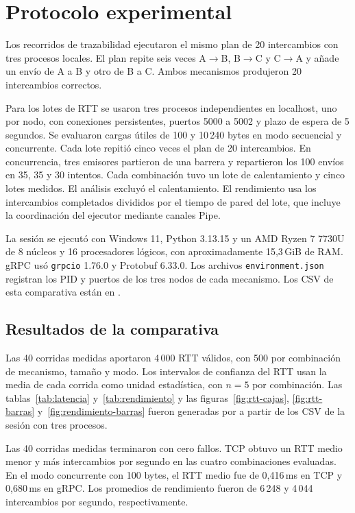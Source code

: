 \section{Protocolo experimental}
Los recorridos de trazabilidad ejecutaron el mismo plan de 20 intercambios con tres procesos locales. El plan repite seis veces A$\to$B, B$\to$C y C$\to$A y añade un envío de A a B y otro de B a C. Ambos mecanismos produjeron 20 intercambios correctos.

Para los lotes de RTT se usaron tres procesos independientes en localhost, uno por nodo, con conexiones persistentes, puertos 5000 a 5002 y plazo de espera de 5 segundos. Se evaluaron cargas útiles de 100 y 10\,240 bytes en modo secuencial y concurrente. Cada lote repitió cinco veces el plan de 20 intercambios. En concurrencia, tres emisores partieron de una barrera y repartieron los 100 envíos en 35, 35 y 30 intentos. Cada combinación tuvo un lote de calentamiento y cinco lotes medidos. El análisis excluyó el calentamiento. El rendimiento usa los intercambios completados divididos por el tiempo de pared del lote, que incluye la coordinación del ejecutor mediante canales Pipe.

La sesión se ejecutó con Windows 11, Python 3.13.15 y un AMD Ryzen 7 7730U de 8 núcleos y 16 procesadores lógicos, con aproximadamente 15,3\,GiB de RAM. gRPC usó \texttt{grpcio} 1.76.0 y Protobuf 6.33.0. Los archivos \texttt{environment.json} registran los PID y puertos de los tres nodos de cada mecanismo. Los CSV de esta comparativa están en .

\subsection{Resultados de la comparativa}
Las 40 corridas medidas aportaron 4\,000 RTT válidos, con 500 por combinación de mecanismo, tamaño y modo. Los intervalos de confianza del RTT usan la media de cada corrida como unidad estadística, con \(n=5\) por combinación. Las tablas~\ref{tab:latencia} y~\ref{tab:rendimiento} y las figuras~\ref{fig:rtt-cajas}, \ref{fig:rtt-barras} y~\ref{fig:rendimiento-barras} fueron generadas por  a partir de los CSV de la sesión con tres procesos.

Las 40 corridas medidas terminaron con cero fallos. TCP obtuvo un RTT medio menor y más intercambios por segundo en las cuatro combinaciones evaluadas. En el modo concurrente con 100 bytes, el RTT medio fue de 0,416\,ms en TCP y 0,680\,ms en gRPC. Los promedios de rendimiento fueron de 6\,248 y 4\,044 intercambios por segundo, respectivamente.

